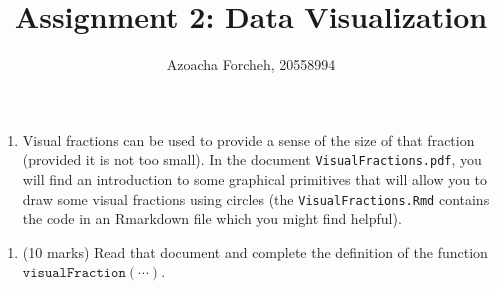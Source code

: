 \documentclass[9pt,letter]{article}
\title{Assignment 2: Data Visualization}
\subtitle{Azoacha Forcheh, 20558994}
\author{}
\date{}
\providecommand{\tightlist}{%
  \setlength{\itemsep}{0pt}\setlength{\parskip}{0pt}}
\begin{document}
\maketitle

\begin{enumerate}
\def\labelenumi{\arabic{enumi}.}
\tightlist
\item
  Visual fractions can be used to provide a sense of the size of that
  fraction (provided it is not too small). In the document
  \texttt{VisualFractions.pdf}, you will find an introduction to some
  graphical primitives that will allow you to draw some visual fractions
  using circles (the \texttt{VisualFractions.Rmd} contains the code in
  an Rmarkdown file which you might find helpful).
\end{enumerate}

\begin{enumerate}
\def\labelenumi{(\alph{enumi})}
\item
  (10 marks) Read that document and complete the definition of the
  function \(\mathtt{visualFraction(\cdots)}\).


\end{enumerate}
\end{document}
